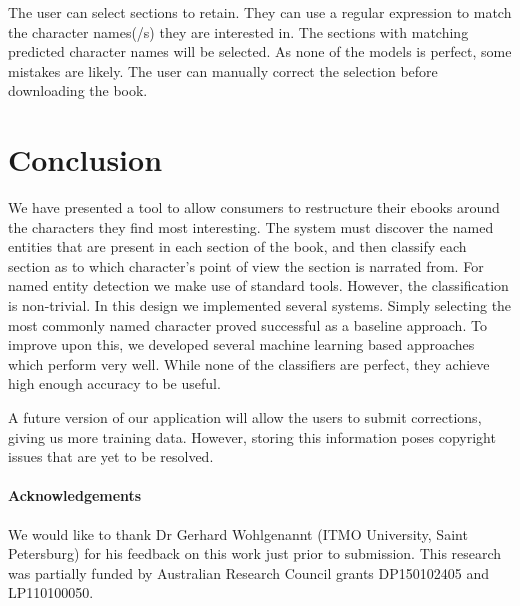 \documentclass[]{book}
\begin{document}
The user can select sections to retain.
They can use a regular expression to match the character names(/s) they are interested in.
The sections with matching predicted character names will be selected.
As none of the models is perfect, some mistakes are likely.
The user can manually correct the selection before downloading the book.



\section{Conclusion}\label{sec:conclusion}
We have presented a tool to allow consumers to restructure their ebooks around the characters they find most interesting.
The system must discover the named entities that are present in each section of the book,
and then classify each section as to which character's point of view the section is narrated from.
For named entity detection we make use of standard tools.
However, the classification is non-trivial.
In this design we implemented several systems.
Simply selecting the most commonly named character proved successful as a baseline approach.
To improve upon this, we developed several machine learning based approaches which perform very well.
While none of the classifiers are perfect, they achieve high enough accuracy to be useful.

A future version of our application will allow the users to submit corrections, giving us more training data.
However, storing this information poses copyright issues that are yet to be resolved.

\paragraph{Acknowledgements}
We would like to thank Dr Gerhard Wohlgenannt (ITMO University, Saint Petersburg) for his feedback on this work just prior to submission.
This research was partially funded by Australian Research Council grants DP150102405 and LP110100050.
\end{document}
